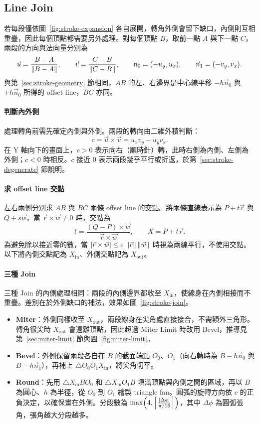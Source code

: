 \subsection{Line Join}
\label{sec:line-join}

若每段僅依圖~\ref{fig:stroke-expansion} 各自展開，轉角外側會留下缺口，內側則互相重疊，因此每個頂點都需要另外處理。對每個頂點 $B$，取前一點 $A$ 與下一點 $C$，兩段的方向與法向量分別為
\[
    \vec u=\frac{B-A}{\left\| B-A \right\|},\qquad
    \vec v=\frac{C-B}{\left\| C-B \right\|},\qquad
    \vec n_0=(-u_y,u_x),\qquad
    \vec n_1=(-v_y,v_x).
\]
與第~\ref{sec:stroke-geometry} 節相同，$AB$ 的左、右邊界是中心線平移 $-h\vec n_0$ 與 $+h\vec n_0$ 所得的 offset line，$BC$ 亦同。

\paragraph{判斷內外側}
處理轉角前需先確定內側與外側。兩段的轉向由二維外積判斷：
\[
    c=\vec u\times\vec v=u_xv_y-u_yv_x.
\]
在 Y 軸向下的畫面上，$c>0$ 表示向右（順時針）轉，此時右側為內側、左側為外側；$c<0$ 時相反。$c$ 接近 $0$ 表示兩段幾乎平行或折返，於第~\ref{sec:stroke-degenerate} 節說明。

\paragraph{求 offset line 交點}
左右兩側分別求 $AB$ 與 $BC$ 兩條 offset line 的交點。將兩條直線表示為 $P+t\vec r$ 與 $Q+s\vec w$，當 $\vec r\times\vec w\ne0$ 時，交點為
\[
    t=\frac{(Q-P)\times\vec w}{\vec r\times\vec w},\qquad X=P+t\vec r.
\]
為避免除以接近零的數，當 $\left| \vec r\times\vec w \right|\le\varepsilon\,\left\| \vec r \right\|\left\| \vec w \right\|$ 時視為兩線平行，不使用交點。以下將內側交點記為 $X_{\text{in}}$、外側交點記為 $X_{\text{out}}$。

\paragraph{三種 Join}
三種 Join 的內側處理相同：兩段的內側邊界都收至 $X_{\text{in}}$，使線身在內側相接而不重疊。差別在於外側缺口的補法，效果如圖~\ref{fig:stroke-join}。
\begin{itemize}
    \item \textbf{Miter}：外側同樣收至 $X_{\text{out}}$，兩段線身在尖角處直接接合，不需額外三角形。轉角很尖時 $X_{\text{out}}$ 會遠離頂點，因此超過 Miter Limit 時改用 Bevel，推導見第~\ref{sec:miter-limit} 節與圖~\ref{fig:miter-limit}。
    \item \textbf{Bevel}：外側保留兩段各自在 $B$ 的截面端點 $O_0$、$O_1$（向右轉時為 $B-h\vec n_0$ 與 $B-h\vec n_1$），再補上 $\triangle O_0O_1X_{\text{in}}$，將尖角切平。
    \item \textbf{Round}：先用 $\triangle X_{\text{in}}BO_0$ 和 $\triangle X_{\text{in}}O_1B$ 填滿頂點與內側之間的區域，再以 $B$ 為圓心、$h$ 為半徑，從 $O_0$ 到 $O_1$ 繪製 triangle fan。圓弧的旋轉方向依 $c$ 的正負決定，以確保畫在外側。分段數為 $\max\!\left(4,\left\lceil\frac{\left| \Delta\phi \right|}{\pi/16}\right\rceil\right)$，其中 $\Delta\phi$ 為圓弧張角，張角越大分段越多。
\end{itemize}

